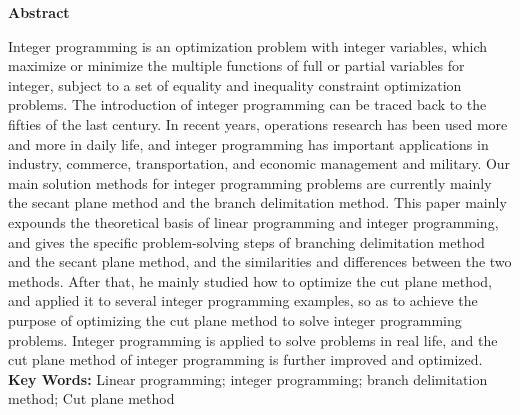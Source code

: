 \documentclass[
	StudentName     = 杨晓宇,
	StudentID       = 1922105012,
	AdvisorName     = 王俊,
	Major           = 信息与计算科学,
	Department      = 理学院,
	SubmitYear		= 2023,
	SubmitMonth		= 6,
	Title           = 加速割平面法的技巧探究,
	TitleEng        = {{Accelerate the exploration of the techniques of the cut plane method}}
]{just_thesis}
\begin{document}
	\newpage
	\setlength{\headsep}{1.224cm}
	\begin{center}
		 \textbf{Abstract} 
	\end{center}
	\vspace{21pt}
	Integer programming is an optimization problem with integer variables, which maximize or minimize the multiple functions of full or partial variables for integer, subject to a set of equality and inequality constraint optimization problems. The introduction of integer programming can be traced back to the fifties of the last century. In recent years, operations research has been used more and more in daily life, and integer programming has important applications in industry, commerce, transportation, and economic management and military. Our main solution methods for integer programming problems are currently mainly the secant plane method and the branch delimitation method.
This paper mainly expounds the theoretical basis of linear programming and integer programming, and gives the specific problem-solving steps of branching delimitation method and the secant plane method, and the similarities and differences between the two methods. After that, he mainly studied how to optimize the cut plane method, and applied it to several integer programming examples, so as to achieve the purpose of optimizing the cut plane method to solve integer programming problems. Integer programming is applied to solve problems in real life, and the cut plane method of integer programming is further improved and optimized.
	\newline
	\newline
	\indent{}\textbf{Key Words: }\songti Linear programming; integer programming; branch delimitation method; Cut plane method
	
	\newpage
	\setlength{\headsep}{-0.3cm}
	\tableofcontents
	\clearpage	%
	\setcounter{page}{1}

	\setlength{\headsep}{0.624cm}
	\pagestyle{fancy}
	\setlength{\baselineskip}{20pt}
	
	
	
\end{document}

